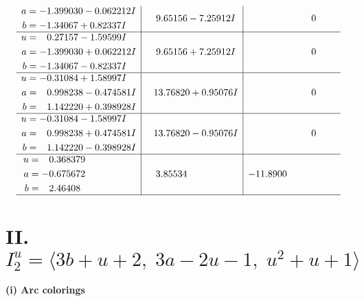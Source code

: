 \documentclass[1p]{elsarticle_modified}
\theoremstyle{definition}
\begin{document}
$$\begin{array}{c|c|c}
\begin{aligned}
a &= -1.399030 - 0.062212 I \\
b &= -1.34067 + 0.82337 I\end{aligned}
 & \phantom{-}9.65156 - 7.25912 I & \phantom{-0.000000 } 0 \\ \hline\begin{aligned}
u &= \phantom{-}0.27157 - 1.59599 I \\
a &= -1.399030 + 0.062212 I \\
b &= -1.34067 - 0.82337 I\end{aligned}
 & \phantom{-}9.65156 + 7.25912 I & \phantom{-0.000000 } 0 \\ \hline\begin{aligned}
u &= -0.31084 + 1.58997 I \\
a &= \phantom{-}0.998238 - 0.474581 I \\
b &= \phantom{-}1.142220 + 0.398928 I\end{aligned}
 & \phantom{-}13.76820 + 0.95076 I & \phantom{-0.000000 } 0 \\ \hline\begin{aligned}
u &= -0.31084 - 1.58997 I \\
a &= \phantom{-}0.998238 + 0.474581 I \\
b &= \phantom{-}1.142220 - 0.398928 I\end{aligned}
 & \phantom{-}13.76820 - 0.95076 I & \phantom{-0.000000 } 0 \\ \hline\begin{aligned}
u &= \phantom{-}0.368379\phantom{ +0.000000I} \\
a &= -0.675672\phantom{ +0.000000I} \\
b &= \phantom{-}2.46408\phantom{ +0.000000I}\end{aligned}
 & \phantom{-}3.85534\phantom{ +0.000000I} & -11.8900\phantom{ +0.000000I}\\
 \hline 
 \end{array}$$\newpage\newpage\renewcommand{\arraystretch}{1}
\centering \section*{II. $I^u_{2}= \langle 3 b+u+2,\;3 a-2 u-1,\;u^2+u+1 \rangle$}
\flushleft \textbf{(i) Arc colorings}\\
\end{document}
